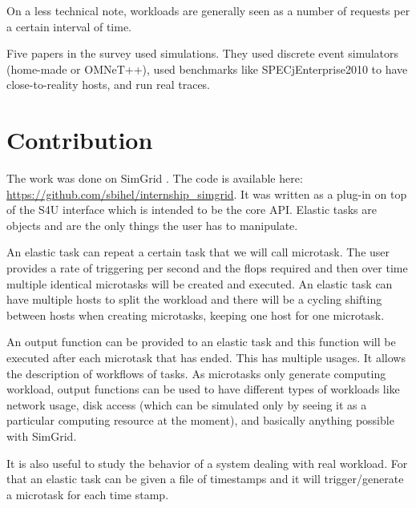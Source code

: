 \documentclass[a4paper, onecolumn]{article}
\begin{document}
  On a less technical note, workloads are generally seen as a number of 
  requests per a certain interval of time.
  
  Five papers in the survey used simulations. They used discrete event 
  simulators (home-made or OMNeT++), used benchmarks like SPECjEnterprise2010 
  to have close-to-reality hosts, and run real traces.
  


\section{Contribution} \label{contrib}
  The work was done on SimGrid \cite{casanova:hal-01017319}. The code is
  available here: \url{https://github.com/sbihel/internship_simgrid}. It was
  written as a plug-in on top of the S4U interface which is intended to be the
  core API. Elastic tasks are objects and are the only things the user has to
  manipulate.
  
  An elastic task can repeat a certain task that we will call microtask. The 
  user provides a rate of triggering per second and the flops required and then 
  over time multiple identical microtasks will be created and executed. An 
  elastic task can have multiple hosts to split the workload and there will be 
  a cycling shifting between hosts when creating microtasks, keeping one host 
  for one microtask.
  
  An output function can be provided to an elastic task and this function will 
  be executed after each microtask that has ended. This has multiple usages. It 
  allows the description of workflows of tasks. As microtasks only generate 
  computing workload, output functions can be used to have different types of 
  workloads like network usage, disk access (which can be simulated only by 
  seeing it as a particular computing resource at the moment), and basically 
  anything possible with SimGrid.
  
  It is also useful to study the behavior of a system dealing with real 
  workload. For that an elastic task can be given a file of timestamps and it 
  will trigger/generate a microtask for each time stamp.
  
\end{document}
